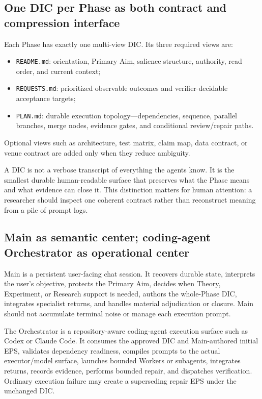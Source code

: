 \documentclass[11pt,a4paper]{article}
\begin{document}
\subsection{One DIC per Phase as both contract and compression interface}\label{sec:dic-rationale}
Each Phase has exactly one multi-view DIC. Its three required views are:
\begin{itemize}
\item \texttt{README.md}: orientation, Primary Aim, salience structure, authority, read order, and current context;
\item \texttt{REQUESTS.md}: prioritized observable outcomes and verifier-decidable acceptance targets;
\item \texttt{PLAN.md}: durable execution topology---dependencies, sequence, parallel branches, merge nodes, evidence gates, and conditional review/repair paths.
\end{itemize}
Optional views such as architecture, test matrix, claim map, data contract, or venue contract are added only when they reduce ambiguity.

A DIC is not a verbose transcript of everything the agents know. It is the smallest durable human-readable surface that preserves what the Phase means and what evidence can close it. This distinction matters for human attention: a researcher should inspect one coherent contract rather than reconstruct meaning from a pile of prompt logs.

\subsection{Main as semantic center; coding-agent Orchestrator as operational center}\label{sec:orchestrator-translation}
Main is a persistent user-facing chat session. It recovers durable state, interprets the user's objective, protects the Primary Aim, decides when Theory, Experiment, or Research support is needed, authors the whole-Phase DIC, integrates specialist returns, and handles material adjudication or closure. Main should not accumulate terminal noise or manage each execution prompt.

The Orchestrator is a repository-aware coding-agent execution surface such as Codex or Claude Code. It consumes the approved DIC and Main-authored initial EPS, validates dependency readiness, compiles prompts to the actual executor/model surface, launches bounded Workers or subagents, integrates returns, records evidence, performs bounded repair, and dispatches verification. Ordinary execution failure may create a superseding repair EPS under the unchanged DIC.
\end{document}
